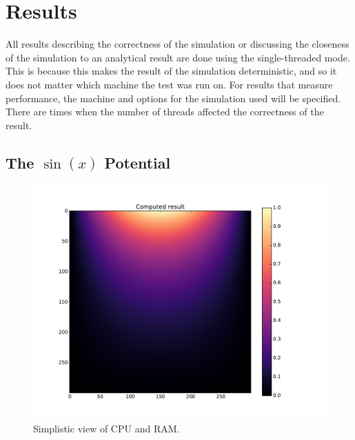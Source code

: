 \section{Results}

All results describing the correctness of the simulation or discussing the closeness of the simulation to an analytical
result are done using the single-threaded mode. This is because this makes the result of the simulation deterministic,
and so it does not matter which machine the test was run on. For results that measure performance, the machine and options
for the simulation used will be specified. There are times when the number of threads affected the correctness of the
result.

\subsection{The $\sin(x)$ Potential}

	\begin{figure}[h]
	\centering
	\includegraphics[width=1.1\linewidth]{sin300_calc.pdf}
	\caption{Simplistic view of CPU and RAM.} 
	\label{fig:sin-result}
	\end{figure}

